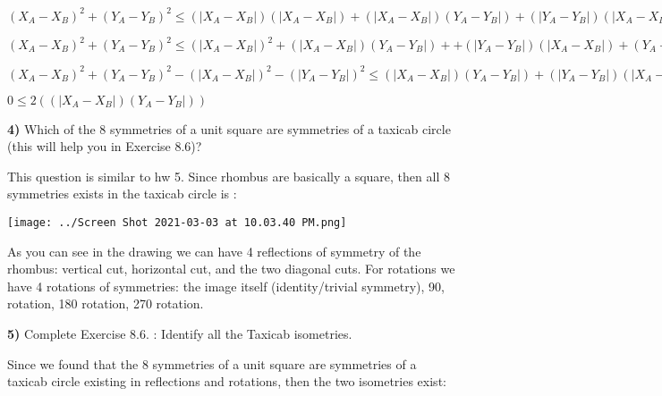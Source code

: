\documentclass{article}
\begin{document}
$(X_{A}-X_{B})^{2} + (Y_{A}-Y_{B})^{2} \le (|X_{A}-X_{B}|)(|X_{A}-X_{B}|) + (|X_{A}-X_{B}|)(Y_{A}-Y_{B}|) + (|Y_{A}-Y_{B}|)(|X_{A}-X_{B}|) + (|Y_{A}-Y_{B}|)(Y_{A}-Y_{B}|)$

\vspace{2mm}

$(X_{A}-X_{B})^{2} + (Y_{A}-Y_{B})^{2} \le (|X_{A}-X_{B}|)^{2} + (|X_{A}-X_{B}|)(Y_{A}-Y_{B}|) + + (|Y_{A}-Y_{B}|)(|X_{A}-X_{B}|) + (Y_{A}-Y_{B}|)^{2}$


\vspace{2mm}


$(X_{A}-X_{B})^{2} + (Y_{A}-Y_{B})^{2}-(|X_{A}-X_{B}|)^{2} - (|Y_{A}-Y_{B}|)^{2} \le (|X_{A}-X_{B}|)(Y_{A}-Y_{B}|) + (|Y_{A}-Y_{B}|)(|X_{A}-X_{B}|) $

\vspace{2mm}

$0 \le 2((|X_{A}-X_{B}|)(Y_{A}-Y_{B}|))$






\newpage


\textbf{4)} Which of the 8 symmetries of a unit square are symmetries of a taxicab circle (this will help you in Exercise 8.6)?

\vspace{2mm}

This question is similar to hw 5. Since rhombus are basically a square, then all 8 symmetries exists in  the taxicab circle is :

\vspace{2mm}

\texttt{[image: ../Screen Shot 2021-03-03 at 10.03.40 PM.png]}

\vspace{2mm}


As you can see in the drawing we can have 4 reflections of symmetry of the rhombus: vertical cut, horizontal cut, and the two diagonal cuts. For rotations we have 4 rotations of symmetries: the image itself (identity/trivial symmetry), 90, rotation, 180  rotation, 270 rotation.


\newpage


\textbf{5)} Complete Exercise 8.6. : Identify all the Taxicab isometries.

Since we found that the 8 symmetries of a unit square are symmetries of a taxicab circle existing in reflections and rotations, then the two isometries exist:
\end{document}
